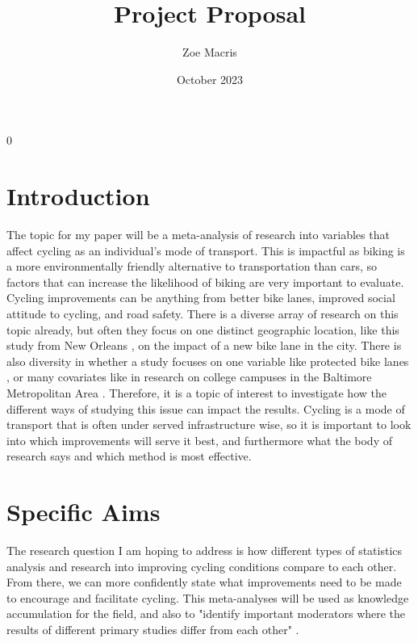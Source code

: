 \documentclass[12pt, letterpaper]{article}
\newcommand{\blind}{0}
\begin{document}

\blind
{
  \title{\bf Project Proposal}
  \author{Zoe Macris}
\date{October 2023}
  \maketitle} 


\section{Introduction}
\label{sec:intro}

The topic for my paper will be a meta-analysis of research into variables that affect cycling as an individual’s mode of transport. This is impactful as biking is a more environmentally friendly alternative to transportation than cars, so factors that can increase the likelihood of biking are very important to evaluate. Cycling improvements can be anything from better bike lanes, improved social attitude to cycling, and road safety. There is a diverse array of research on this topic already, but often they focus on one distinct geographic location, like this study from New Orleans \cite{Parker2013}, on the impact of a new bike lane in the city. There is also diversity in whether a study focuses on one variable like protected bike lanes \cite{Karpinski2021}, or many covariates like in research on college campuses in the Baltimore Metropolitan Area \cite{Kelarestaghi2019}. Therefore, it is a topic of interest to investigate how the different ways of studying this issue can impact the results. Cycling is a mode of transport that is often under served infrastructure wise, so it is important to look into which improvements will serve it best, and furthermore what the body of research says and which method is most effective.


\section{Specific Aims}
\label{sec:fitted}

The research question I am hoping to address is how different types of statistics analysis and research into improving cycling conditions compare to each other. From there, we can more confidently state what improvements need to be made to encourage and facilitate cycling. This meta-analyses will be used as knowledge accumulation for the field, and also to "identify important moderators where the results of different primary studies differ from each other" \citep{Hansen2022}.
\end{document}
